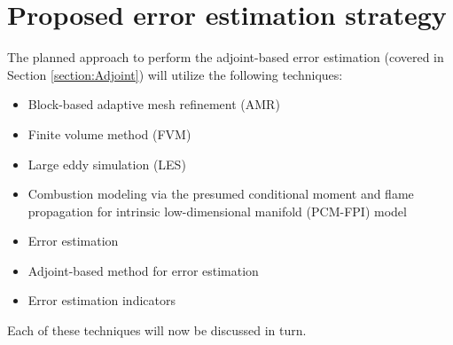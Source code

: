 \documentclass[titlepage,11pt,letterpaper]{article}
\numberwithin{equation}{subsection}
\begin{document}
\thispagestyle{empty}\titleRR
\clearpage
\setcounter{page}{1}


\newpage


\section{Proposed error estimation strategy}

The planned approach to perform the adjoint-based error estimation (covered in Section \ref{section:Adjoint}) will utilize the following techniques:

\begin{itemize}
\item Block-based adaptive mesh refinement (AMR)
\item Finite volume method (FVM)
\item Large eddy simulation (LES)
\item Combustion modeling via the presumed conditional moment and flame propagation for intrinsic low-dimensional manifold (PCM-FPI) model
\item Error estimation
\item Adjoint-based method for error estimation
\item Error estimation indicators
\end{itemize}

Each of these techniques will now be discussed in turn.


\end{document}
